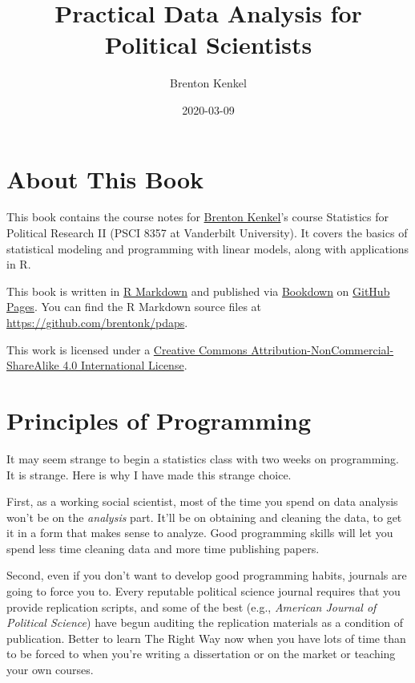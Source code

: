 \documentclass[12pt,oneside,openany]{book}
\title{Practical Data Analysis for Political Scientists}
\author{Brenton Kenkel}
\date{2020-03-09}
\begin{document}
\maketitle

{
\setcounter{tocdepth}{1}
\tableofcontents
}
\chapter{About This Book}\label{about-this-book}

This book contains the course notes for
\href{http://bkenkel.com}{Brenton Kenkel}'s course Statistics for
Political Research II (PSCI 8357 at Vanderbilt University). It covers
the basics of statistical modeling and programming with linear models,
along with applications in R.

This book is written in \href{http://rmarkdown.rstudio.com}{R Markdown}
and published via \href{https://bookdown.org}{Bookdown} on
\href{https://pages.github.com}{GitHub Pages}. You can find the R
Markdown source files at \url{https://github.com/brentonk/pdaps}.

This work is licensed under a
\href{http://creativecommons.org/licenses/by-nc-sa/4.0/}{Creative
Commons Attribution-NonCommercial-ShareAlike 4.0 International License}.

\hypertarget{programming}{\chapter{Principles of
Programming}\label{programming}}

It may seem strange to begin a statistics class with two weeks on
programming. It is strange. Here is why I have made this strange choice.

First, as a working social scientist, most of the time you spend on data
analysis won't be on the \emph{analysis} part. It'll be on obtaining and
cleaning the data, to get it in a form that makes sense to analyze. Good
programming skills will let you spend less time cleaning data and more
time publishing papers.

Second, even if you don't want to develop good programming habits,
journals are going to force you to. Every reputable political science
journal requires that you provide replication scripts, and some of the
best (e.g., \emph{American Journal of Political Science}) have begun
auditing the replication materials as a condition of publication. Better
to learn The Right Way now when you have lots of time than to be forced
to when you're writing a dissertation or on the market or teaching your
own courses.
\end{document}
